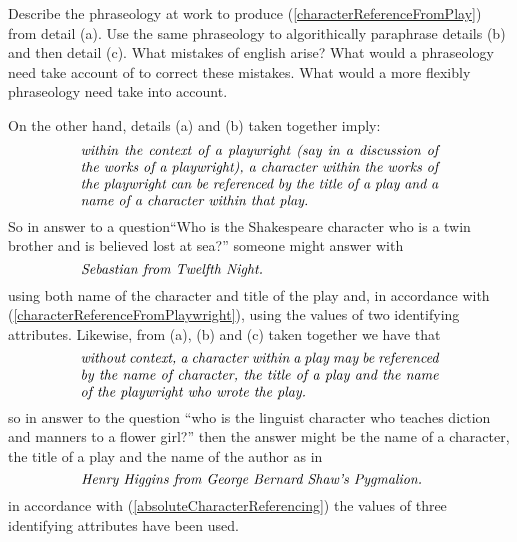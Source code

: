 \begin{exerciseforreader}
Describe the phraseology 
at work to produce  (\ref{characterReferenceFromPlay}) from detail (a). 
Use the same phraseology to algorithically paraphrase details (b) and then detail (c).
What mistakes of english arise?
What would a phraseology need take account of to correct these mistakes.
What would a more flexibly phraseology need take into account.
\end{exerciseforreader}
 
\mynote %
On the other hand, details (a) and (b) taken together imply: 
\begin{equation}
\label{characterReferenceFromPlaywright}
\text{\parbox{9cm}{\textit{within the context of a playwright
(say in a discussion of the works of a playwright), 
a character within the works of the playwright 
can be referenced by the title of a play 
and a name of a character within that play. }}}\\
\end{equation}
So in answer to a question``Who is the Shakespeare character who is a twin brother and is believed lost at sea?''
someone might answer with 
\begin{equation*}
\label{antonioReferenceFromPlaywright}
\text{\parbox{9cm}{\textit{Sebastian from Twelfth Night. }}}\\
\end{equation*}
using both name of the character and title of the play and, 
in accordance with (\ref{characterReferenceFromPlaywright}),
using the values of two identifying attributes.
\mynote 
Likewise, from (a), (b) and (c) taken together we have that
\begin{equation} 
\label{absoluteCharacterReferencing}
\text{\parbox{9cm}{\textit{without context, a character within a play 
may be referenced by the name of character, the title of a play and the name of the playwright who wrote the play.}}}
\end{equation}
so in answer to the question ``who is the linguist character who teaches diction and manners to a flower girl?''
 then the answer might be the name of a character, the title of a play and the name of the author as in 
 \begin{equation*}
\label{HenryHigginsReferenceFromAbsolute}
\text{\parbox{9cm}{\textit{Henry Higgins from George Bernard Shaw's Pygmalion. }}}\\
\end{equation*}
in accordance with (\ref{absoluteCharacterReferencing}) the values of three identifying attributes have been used.

